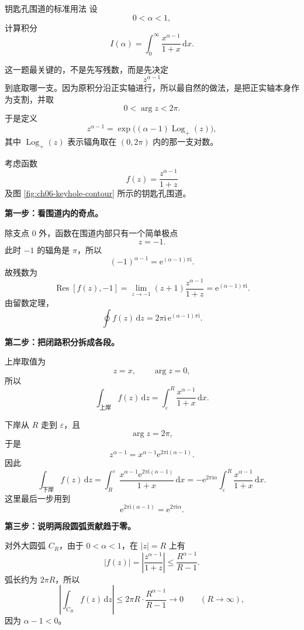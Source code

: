 \begin{lizi}{钥匙孔围道的标准用法}{}
设
\[
    0<\alpha<1,
\]
计算积分
\[
    I(\alpha)=\int_0^\infty \frac{x^{\alpha-1}}{1+x}\,\mathrm{d}x.
\]

\begin{jie}
这一题最关键的，不是先写残数，而是先决定
\[
    z^{\alpha-1}
\]
到底取哪一支。因为原积分沿正实轴进行，所以最自然的做法，是把正实轴本身作为支割，并取
\[
    0<\arg z<2\pi.
\]
于是定义
\[
    z^{\alpha-1}=\exp\bigl((\alpha-1)\operatorname{Log}_+(z)\bigr),
\]
其中 $\operatorname{Log}_+(z)$ 表示辐角取在 $(0,2\pi)$ 内的那一支对数。

考虑函数
\[
    f(z)=\frac{z^{\alpha-1}}{1+z}
\]
及图 \ref{fig:ch06-keyhole-contour} 所示的钥匙孔围道。

\textbf{第一步：看围道内的奇点。}

除支点 $0$ 外，函数在围道内部只有一个简单极点
\[
    z=-1.
\]
此时 $-1$ 的辐角是 $\pi$，所以
\[
    (-1)^{\alpha-1}=\mathrm{e}^{(\alpha-1)\pi\mathrm{i}}.
\]
故残数为
\[
    \operatorname{Res}[f(z),-1]
    =\lim_{z\to -1}(z+1)\frac{z^{\alpha-1}}{1+z}
    =\mathrm{e}^{(\alpha-1)\pi\mathrm{i}}.
\]
由留数定理，
\[
    \oint f(z)\,\mathrm{d}z
    =
    2\pi\mathrm{i}\,\mathrm{e}^{(\alpha-1)\pi\mathrm{i}}.
\]

\textbf{第二步：把闭路积分拆成各段。}

上岸取值为
\[
    z=x,\qquad \arg z=0,
\]
所以
\[
    \int_{\text{上岸}} f(z)\,\mathrm{d}z
    =
    \int_\varepsilon^R \frac{x^{\alpha-1}}{1+x}\,\mathrm{d}x.
\]

下岸从 $R$ 走到 $\varepsilon$，且
\[
    \arg z=2\pi,
\]
于是
\[
    z^{\alpha-1}=x^{\alpha-1}\mathrm{e}^{2\pi\mathrm{i}(\alpha-1)}.
\]
因此
\[
    \int_{\text{下岸}} f(z)\,\mathrm{d}z
    =
    \int_R^\varepsilon
    \frac{x^{\alpha-1}\mathrm{e}^{2\pi\mathrm{i}(\alpha-1)}}{1+x}\,\mathrm{d}x
    =
    -\mathrm{e}^{2\pi\mathrm{i}\alpha}
    \int_\varepsilon^R \frac{x^{\alpha-1}}{1+x}\,\mathrm{d}x.
\]
这里最后一步用到
\[
    \mathrm{e}^{2\pi\mathrm{i}(\alpha-1)}=\mathrm{e}^{2\pi\mathrm{i}\alpha}.
\]

\textbf{第三步：说明两段圆弧贡献趋于零。}

对外大圆弧 $C_R$，由于 $0<\alpha<1$，在 $|z|=R$ 上有
\[
    |f(z)|
    =
    \left|\frac{z^{\alpha-1}}{1+z}\right|
    \le
    \frac{R^{\alpha-1}}{R-1}.
\]
弧长约为 $2\pi R$，所以
\[
    \left|\int_{C_R} f(z)\,\mathrm{d}z\right|
    \le
    2\pi R\cdot \frac{R^{\alpha-1}}{R-1}
    \to 0
    \qquad (R\to\infty),
\]
因为 $\alpha-1<0$。


\end{jie}
\end{lizi}
